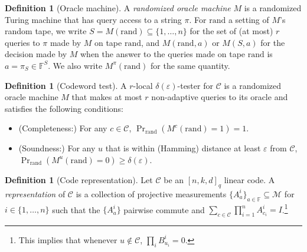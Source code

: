 \documentclass[11pt]{article}
\theoremstyle{definition}
\newtheorem{definition}[theorem]{Definition}
\newcommand{\code}{\mathcal{C}}
\newcommand{\Id}{\ensuremath{I}}
\newcommand{\field}{\mathbb{F}}
\newcommand{\N}{\ensuremath{\mathbb{N}}}
\newcommand{\mM}{\ensuremath{\mathcal{M}}}
\newcommand{\rand}{\textrm{rand}}
\newcommand{\eps}{\varepsilon}
\begin{document}
\begin{definition}[Oracle machine]
A \emph{randomized oracle machine} $M$ is a randomized Turing machine that has query access to a string $\pi$. For $\rand$ a setting of $M$'s random tape, we write $S=M(\rand)\subseteq\{1,\ldots,n\}$ for the set of (at most) $r$ queries to $\pi$ made by $M$ on tape $\rand$, and $M(\rand,a)$ or $M(S,a)$ for the decision made by $M$ when the answer to the queries made on tape $\rand$ is $a=\pi_S\in \field^S$. We also write $M^\pi(\rand)$ for the same quantity.  
\end{definition}

\begin{definition}[Codeword test]
A $r$-local $\delta(\eps)$-tester for $\code$ is a randomized oracle machine $M$ that makes at most $r$ non-adaptive queries to its oracle and satisfies the following conditions:
\begin{itemize} 
\item (Completeness:) For any $c\in \code$, $\Pr_\rand( M^c(\rand)=1)=1$.
\item (Soundness:) For any $u$ that is within (Hamming) distance at least  $\eps$ from $\code$, $\Pr_\rand(M^u(\rand)=0)\geq \delta(\eps)$. 
\end{itemize}
\end{definition}


\begin{definition}[Code representation]
Let $\code$ be an $[n,k,d]_q$ linear code. A \emph{representation} of $\code$ is a collection of projective measurements $\{A^i_a\}_{a\in\field} \subseteq\mM$ for $i\in\{1,\ldots,n\}$ such that the $\{A^i_a\}$ pairwise commute and $\sum_{c\in\code} \prod_{i=1}^n A^i_{c_i}=\Id$.\footnote{This implies that whenever $u\notin \code$, $\prod_i B^i_{u_i}=0$.} 
\end{definition}
\end{document}
